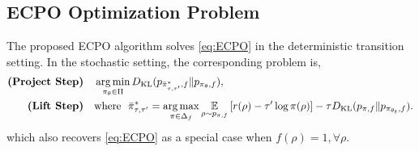 \subsection{ECPO Optimization Problem}

The proposed ECPO algorithm solves \cref{eq:ECPO} in the deterministic transition setting. In the stochastic setting, the corresponding problem is,
\begin{equation}
\label{eq:ECPO_stochastic}
\begin{split}
\text{\bf (Project Step)} \quad &\argmin\limits_{\pi_\theta \in \Pi}{\KL(p_{\bar{\pi}_{\tau,\tau^{\prime}}^*, f}  \| p_{\pi_\theta, f} ) }, \\
\text{\bf (Lift Step)}  \quad & \text{where}\ \ \bar{\pi}_{\tau,\tau^{\prime}}^* =  \argmax\limits_{\pi \in \Delta_f}{ \ep\limits_{\rho \sim p_{\pi, f}}{ \left[ r(\rho) - \tau^{\prime} \log{\pi(\rho)} \right] } - \tau \KL(p_{\pi, f} \| p_{\pi_{\theta_t}, f} ) }. 
\end{split}
\end{equation}
which also recovers \cref{eq:ECPO} as a special case when $f(\rho) = 1, \forall \rho$.

